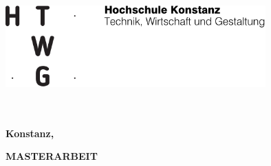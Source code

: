 
\begin{titlepage}

\vspace*{-3.5cm}

\begin{flushleft}
\hspace*{-1cm} \includegraphics[width=10cm]{htwg-logo.png}
\end{flushleft}

\vspace{2.5cm}

\begin{center}
	\huge{
		\textbf{\thema} \\[5cm]
	}
	\Large{
		\textbf{\autor}} \\[6.5cm]
	\large{
		\textbf{Konstanz, \abgabedatum} \\[2.3cm]
	}
	
	\Huge{
		\textbf{{\sf MASTERARBEIT}}
	}
\end{center}

\end{titlepage}
